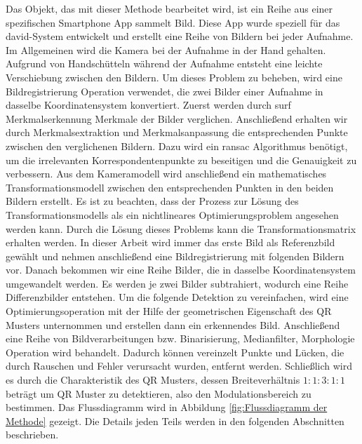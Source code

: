 Das Objekt, das mit dieser Methode bearbeitet wird, ist ein Reihe aus einer spezifischen Smartphone App sammelt Bild. Diese App wurde speziell für das \gls{david}-System entwickelt und erstellt eine Reihe von Bildern bei jeder Aufnahme. Im Allgemeinen wird die Kamera bei der Aufnahme in der Hand gehalten. Aufgrund von Handschütteln während der Aufnahme entsteht eine leichte Verschiebung zwischen den Bildern. Um dieses Problem zu beheben, wird eine Bildregistrierung Operation verwendet, die zwei Bilder einer Aufnahme in dasselbe Koordinatensystem konvertiert. Zuerst werden durch \gls{surf} Merkmalserkennung Merkmale der Bilder verglichen. 
Anschließend erhalten wir durch Merkmalsextraktion und Merkmalsanpassung die entsprechenden Punkte zwischen den verglichenen Bildern. Dazu wird ein \gls{ransac} Algorithmus benötigt, um die irrelevanten Korrespondentenpunkte zu beseitigen und die Genauigkeit zu verbessern. Aus dem Kameramodell wird anschließend ein mathematisches Transformationsmodell zwischen den entsprechenden Punkten in den beiden Bildern erstellt. Es ist zu beachten, dass der Prozess zur Lösung des Transformationsmodells als ein nichtlineares Optimierungsproblem angesehen werden kann.
Durch die Lösung dieses Problems kann die Transformationsmatrix erhalten werden. In dieser Arbeit wird immer das erste Bild als Referenzbild gewählt und nehmen anschließend eine Bildregistrierung mit folgenden Bildern vor. Danach bekommen wir eine Reihe Bilder, die in dasselbe Koordinatensystem umgewandelt werden. Es werden je zwei Bilder subtrahiert, wodurch eine Reihe Differenzbilder entstehen. Um die folgende Detektion zu vereinfachen, wird eine Optimierungsoperation mit der Hilfe der geometrischen Eigenschaft des QR Musters unternommen und erstellen dann ein erkennendes Bild. Anschließend eine Reihe von Bildverarbeitungen bzw. Binarisierung, Medianfilter, Morphologie Operation wird behandelt. Dadurch können vereinzelt Punkte und Lücken, die durch Rauschen und Fehler verursacht wurden, entfernt werden. Schließlich wird es durch die Charakteristik des QR Musters, dessen Breiteverhältnis $1:1:3:1:1$ beträgt um QR Muster zu detektieren, also den Modulationsbereich zu bestimmen. Das Flussdiagramm wird in Abbildung \ref{fig:Flussdiagramm der Methode} gezeigt. Die Details jeden Teils werden in den folgenden Abschnitten beschrieben.

